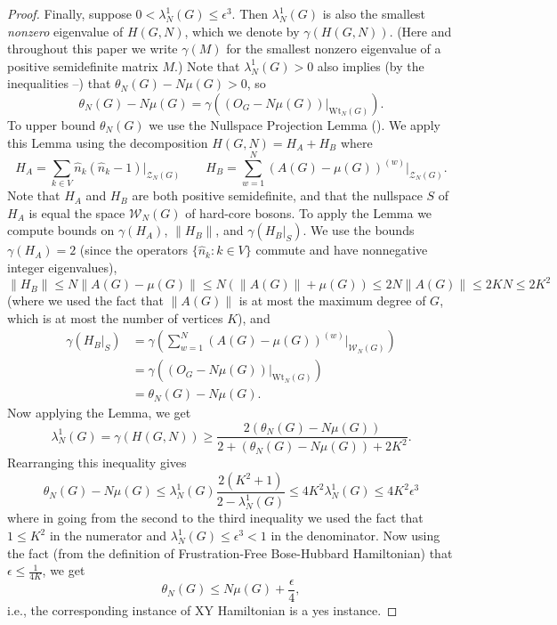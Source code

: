 \documentclass[../thesis-main/thesis-main]{subfiles}
\begin{document}
\begin{proof}
Finally, suppose $0 < \lambda_N^1 (G)\leq \epsilon^3$. Then $\lambda_N^1(G)$
is also the smallest \emph{nonzero} eigenvalue of $H(G,N)$, which we denote by $\gamma(H(G,N))$. (Here and throughout this paper we write $\gamma(M)$ for the smallest nonzero eigenvalue of a positive semidefinite matrix $M$.) Note that $ \lambda_N^1 (G)>0$ also implies (by the inequalities --) that $\theta_N(G)-N\mu(G)>0$, so
\[
\theta_N(G)-N\mu(G)=\gamma\left((O_G -N\mu(G))\big|_{\text{Wt}_N(G)}\right).
\]
To upper bound $\theta_N(G)$ we use the Nullspace Projection Lemma (). We apply this Lemma using the decomposition $H(G,N)=H_A+H_B$ where
\[
H_A=\sum_{k\in V} \widehat{n}_k(\widehat{n}_k-1)\big|_{\mathcal{Z}_N(G)} \qquad H_B=\sum_{w=1}^N \left(A(G)-\mu(G)\right)^{(w)}\big|_{\mathcal{Z}_N(G)}.
\]
Note that $H_A$ and $H_B$ are both positive semidefinite, and that the nullspace $S$ of $H_A$ is equal the space $\mathcal{W}_N(G)$ of hard-core bosons. To apply the Lemma we compute bounds on $\gamma(H_A)$, $\|H_B\|$, and $\gamma(H_B|_S)$. We use the bounds $\gamma(H_A)=2$ (since the operators $\{\widehat{n}_k\colon k\in V\}$ commute and have nonnegative integer eigenvalues),
\[
\|H_B\|\leq N\|A(G)-\mu(G)\|\leq N(\|A(G)\|+\mu(G)) \leq 2N\|A(G)\|\leq 2KN\leq 2K^2
\]
(where we used the fact that $\|A(G)\|$ is at most the maximum degree of $G$, which is at most the number of vertices $K$), and
\begin{align*}
\gamma (H_B|_S)& =\gamma \left(\sum_{w=1}^N \left(A(G)-\mu(G)\right)^{(w)}\big|_{\mathcal{W}_N(G)}\right)\\
& =\gamma\left((O_G -N\mu(G))\big|_{\text{Wt}_N(G)}\right)\\
&= \theta_N(G)-N\mu(G).
\end{align*}
Now applying the Lemma, we get 
\[
\lambda_N^1 (G)=\gamma(H(G,N))\geq \frac{2(\theta_N(G)-N\mu(G))}{2+(\theta_N(G)-N\mu(G))+2K^2}.
\]
Rearranging this inequality gives
\[
\theta_N(G)-N\mu(G) \leq \lambda_N^1(G)\frac{2(K^2+1)}{2-\lambda_N^1(G)}\leq 4K^2 \lambda_N^1(G)\leq 4K^2 \epsilon^3 
\]
where in going from the second to the third inequality we used the fact that $1\leq K^2$ in the numerator and $\lambda_N^1(G)\leq \epsilon^3<1$ in the denominator.  Now using the fact (from the definition of Frustration-Free Bose-Hubbard Hamiltonian) that $\epsilon\leq \frac{1}{4K}$, we get 
\[
\theta_N(G)\leq N\mu(G)+\frac{\epsilon}{4}, 
\]
i.e., the corresponding instance of XY Hamiltonian is a yes instance.
\end{proof}
\end{document}

